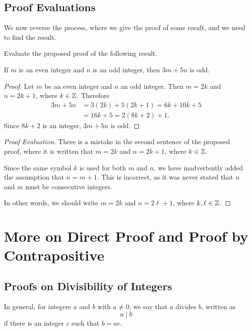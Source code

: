 \newpage
\subsection{Proof Evaluations}
We now reverse the process, where we give the proof of some result, and we need
to find the result.
\begin{eg}
     Evaluate the proposed proof of the following result.
     \begin{center}
        If $m$ is an even integer and $n$ is an odd integer, then $3m + 5n$ is
        odd.
     \end{center}
     \begin{proof}
        Let $m$ be an even integer and $n$ an odd integer. Then $m = 2k$ and $n =
        2k + 1$, where $k \in \mathbb{Z}$. Therefore
        \begin{align*}
            3m+5n &= 3(2k)+5(2k+1) = 6k+10k+5 \\
            &= 16k+5 = 2(8k+2)+1.
        \end{align*}
        Since $8k+2$ is an integer, $3m+5n$ is odd.
     \end{proof}
     \begin{proof}[Proof Evaluation]
        There is a mistake in the second sentence of the proposed proof, where
        it is written that $m = 2k$ and $n = 2k + 1$, where $k \in \mathbb{Z}$.

        Since the same symbol $k$ is used for both $m$ and $n$, we have
        inadvertently added the assumption that $n = m + 1$. This is incorrect,
        as it was never stated that $n$ and $m$ must be consecutive integers. 

        In other words, we should write $m=2k$ and $n=2\ell+1$, where $k,\ell    \in
        \mathbb{Z}$.
     \end{proof}
\end{eg}

\section{More on Direct Proof and Proof by Contrapositive}

\subsection{Proofs on Divisibility of Integers}
\begin{defi}
     In general, for integers $a$ and $b$ with $a \neq 0$, we say that $a$
     divides $b$, written as
     \[a \mid b\]
     if there is an integer $c$ such that $b=ac$.
\end{defi}

